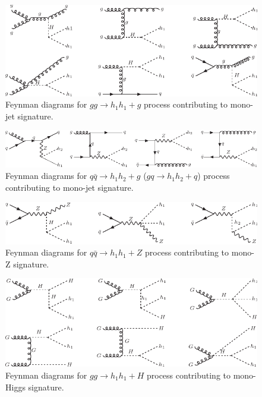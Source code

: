 \begin{figure}
\includegraphics[width=\textwidth]{figures/EW/i2HDM/fd-mono-j1.pdf} 
\caption{Feynman diagrams for $gg\to h_1 h_1+g$ process
contributing to mono-jet signature.}
\label{fig:fd-monojet1}
\end{figure}
\begin{figure}[htb]
\includegraphics[width=\textwidth]{figures/EW/i2HDM/fd-mono-j2.pdf} 
\caption{Feynman diagrams for $q\bar{q}\to h_1 h_2+g$ ($gq\to h_1 h_2+q$) process 
contributing to mono-jet signature.}
\label{fig:fd-monojet2}
\end{figure}
\begin{figure}[htb]
\includegraphics[width=\textwidth]{figures/EW/i2HDM/fd-mono-z.pdf} 
\caption{Feynman diagrams for $q\bar{q}\to h_1 h_1+Z$  process 
contributing to mono-Z signature.}
\label{fig:fd-mono-Z}
\end{figure}
\begin{figure}[htb]
\includegraphics[width=\textwidth]{figures/EW/i2HDM/fd-mono-h1.pdf} 
\caption{Feynman diagrams for $gg\to h_1 h_1+H$  process 
contributing to mono-Higgs signature.}
\label{fig:fd-mono-H1}
\end{figure}
